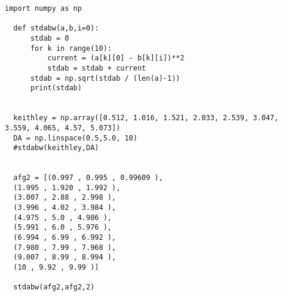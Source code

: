 
 \begin{lstlisting}[style=PYTHON,frame=single,
  caption=Standartabweichung
  captionpos=b,
  label=lst:plot]
  import numpy as np
  
  def stdabw(a,b,i=0):
      stdab = 0
      for k in range(10):
          current = (a[k][0] - b[k][i])**2
          stdab = stdab + current
      stdab = np.sqrt(stdab / (len(a)-1))
      print(stdab)
      
      
  keithley = np.array([0.512, 1.016, 1.521, 2.033, 2.539, 3.047, 3.559, 4.065, 4.57, 5.073])
  DA = np.linspace(0.5,5.0, 10)
  #stdabw(keithley,DA)
  
  
  afg2 = [(0.997 , 0.995 , 0.99609 ),
  (1.995 , 1.920 , 1.992 ),
  (3.007 , 2.88 , 2.998 ),
  (3.996 , 4.02 , 3.984 ),
  (4.975 , 5.0 , 4.986 ),
  (5.991 , 6.0 , 5.976 ),
  (6.994 , 6.99 , 6.992 ),
  (7.980 , 7.99 , 7.968 ),
  (9.007 , 8.99 , 8.994 ),
  (10 , 9.92 , 9.99 )]
  
  stdabw(afg2,afg2,2)
 \end{lstlisting}
 